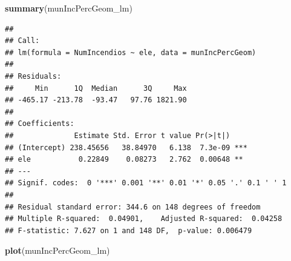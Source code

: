 \documentclass[11pt,]{article}
\newenvironment{Shaded}{\begin{snugshade}}{\end{snugshade}}
\newcommand{\KeywordTok}[1]{\textcolor[rgb]{0.13,0.29,0.53}{\textbf{#1}}}
\newcommand{\NormalTok}[1]{#1}
\begin{document}
\begin{Shaded}
\begin{Highlighting}[]
\KeywordTok{summary}\NormalTok{(munIncPercGeom_lm)}
\end{Highlighting}
\end{Shaded}

\begin{verbatim}
## 
## Call:
## lm(formula = NumIncendios ~ ele, data = munIncPercGeom)
## 
## Residuals:
##     Min      1Q  Median      3Q     Max 
## -465.17 -213.78  -93.47   97.76 1821.90 
## 
## Coefficients:
##              Estimate Std. Error t value Pr(>|t|)    
## (Intercept) 238.45656   38.84970   6.138  7.3e-09 ***
## ele           0.22849    0.08273   2.762  0.00648 ** 
## ---
## Signif. codes:  0 '***' 0.001 '**' 0.01 '*' 0.05 '.' 0.1 ' ' 1
## 
## Residual standard error: 344.6 on 148 degrees of freedom
## Multiple R-squared:  0.04901,    Adjusted R-squared:  0.04258 
## F-statistic: 7.627 on 1 and 148 DF,  p-value: 0.006479
\end{verbatim}

\begin{Shaded}
\begin{Highlighting}[]
\KeywordTok{plot}\NormalTok{(munIncPercGeom_lm)}
\end{Highlighting}
\end{Shaded}
\end{document}
